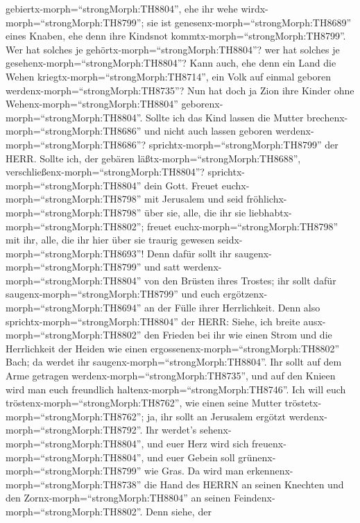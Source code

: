 gebiertx-morph=``strongMorph:TH8804'', ehe ihr wehe
wirdx-morph=``strongMorph:TH8799''; sie ist
genesenx-morph=``strongMorph:TH8689'' eines Knaben, ehe denn ihre
Kindsnot kommtx-morph=``strongMorph:TH8799''.  Wer hat
solches je gehörtx-morph=``strongMorph:TH8804''? wer hat solches je
gesehenx-morph=``strongMorph:TH8804''? Kann auch, ehe denn ein Land die
Wehen kriegtx-morph=``strongMorph:TH8714'', ein Volk auf einmal geboren
werdenx-morph=``strongMorph:TH8735''? Nun hat doch ja Zion ihre Kinder
ohne Wehenx-morph=``strongMorph:TH8804''
geborenx-morph=``strongMorph:TH8804''.  Sollte ich das Kind
lassen die Mutter brechenx-morph=``strongMorph:TH8686'' und nicht auch
lassen geboren werdenx-morph=``strongMorph:TH8686''?
sprichtx-morph=``strongMorph:TH8799'' der HERR. Sollte ich, der gebären
läßtx-morph=``strongMorph:TH8688'',
verschließenx-morph=``strongMorph:TH8804''?
sprichtx-morph=``strongMorph:TH8804'' dein Gott.  Freuet
euchx-morph=``strongMorph:TH8798'' mit Jerusalem und seid
fröhlichx-morph=``strongMorph:TH8798'' über sie, alle, die ihr sie
liebhabtx-morph=``strongMorph:TH8802''; freuet
euchx-morph=``strongMorph:TH8798'' mit ihr, alle, die ihr hier über sie
traurig gewesen seidx-morph=``strongMorph:TH8693''!  Denn
dafür sollt ihr saugenx-morph=``strongMorph:TH8799'' und satt
werdenx-morph=``strongMorph:TH8804'' von den Brüsten ihres Trostes; ihr
sollt dafür saugenx-morph=``strongMorph:TH8799'' und euch
ergötzenx-morph=``strongMorph:TH8694'' an der Fülle ihrer Herrlichkeit.
 Denn also sprichtx-morph=``strongMorph:TH8804'' der HERR:
Siehe, ich breite ausx-morph=``strongMorph:TH8802'' den Frieden bei ihr
wie einen Strom und die Herrlichkeit der Heiden wie einen
ergossenenx-morph=``strongMorph:TH8802'' Bach; da werdet ihr
saugenx-morph=``strongMorph:TH8804''. Ihr sollt auf dem Arme getragen
werdenx-morph=``strongMorph:TH8735'', und auf den Knieen wird man euch
freundlich haltenx-morph=``strongMorph:TH8746''.  Ich will
euch tröstenx-morph=``strongMorph:TH8762'', wie einen seine Mutter
tröstetx-morph=``strongMorph:TH8762''; ja, ihr sollt an Jerusalem
ergötzt werdenx-morph=``strongMorph:TH8792''.  Ihr werdet's
sehenx-morph=``strongMorph:TH8804'', und euer Herz wird sich
freuenx-morph=``strongMorph:TH8804'', und euer Gebein soll
grünenx-morph=``strongMorph:TH8799'' wie Gras. Da wird man
erkennenx-morph=``strongMorph:TH8738'' die Hand des HERRN an seinen
Knechten und den Zornx-morph=``strongMorph:TH8804'' an seinen
Feindenx-morph=``strongMorph:TH8802''.  Denn siehe, der
